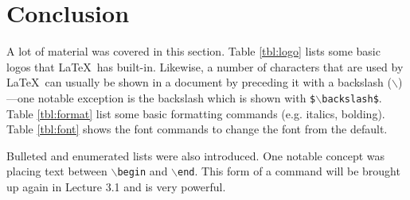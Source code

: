 \documentclass{article}
\begin{document}

\section{Conclusion}

A lot of material was covered in this section. Table \ref{tbl:logo} lists some basic logos that \LaTeX\ has built-in. Likewise, a number of characters that are used by \LaTeX\ can usually be shown in a document by preceding it with a backslash ($\backslash$)---one notable exception is the backslash which is shown with \texttt{\$$\backslash$backslash\$}. Table \ref{tbl:format} list some basic formatting commands (e.g. italics, bolding). Table \ref{tbl:font} shows the font commands to change the font from the default. 

Bulleted and enumerated lists were also introduced. One notable concept was placing text between \texttt{$\backslash$begin} and \texttt{$\backslash$end}. This form of a command will be brought up again in Lecture 3.1 and is very powerful.
\end{document}
